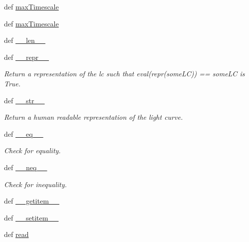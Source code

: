 \begin{DoxyCompactItemize}
def \hyperlink{classpython_1_1libcarma_1_1libcarma_1_1lc_a801161c80acc479a6e76580e34b2e5d1}{max\-Timescale}
\item 
def \hyperlink{classpython_1_1libcarma_1_1libcarma_1_1lc_a801161c80acc479a6e76580e34b2e5d1}{max\-Timescale}
\item 
def \hyperlink{classpython_1_1libcarma_1_1libcarma_1_1lc_ab37669df5bdf0f934f50b13118abc06b}{\-\_\-\-\_\-len\-\_\-\-\_\-}
\item 
def \hyperlink{classpython_1_1libcarma_1_1libcarma_1_1lc_a77ac4622001812f6da9ff42fef654844}{\-\_\-\-\_\-repr\-\_\-\-\_\-}
\begin{DoxyCompactList}\small\item\em Return a representation of the lc such that eval(repr(some\-L\-C)) == some\-L\-C is True. \end{DoxyCompactList}\item 
def \hyperlink{classpython_1_1libcarma_1_1libcarma_1_1lc_abde0414f9b96376bd15efce8d98ffbb4}{\-\_\-\-\_\-str\-\_\-\-\_\-}
\begin{DoxyCompactList}\small\item\em Return a human readable representation of the light curve. \end{DoxyCompactList}\item 
def \hyperlink{classpython_1_1libcarma_1_1libcarma_1_1lc_a0bd6ef26a6db8d90d6feb317f7478b92}{\-\_\-\-\_\-eq\-\_\-\-\_\-}
\begin{DoxyCompactList}\small\item\em Check for equality. \end{DoxyCompactList}\item 
def \hyperlink{classpython_1_1libcarma_1_1libcarma_1_1lc_af328e7a6a692a0eba9c5863f4a74a195}{\-\_\-\-\_\-neq\-\_\-\-\_\-}
\begin{DoxyCompactList}\small\item\em Check for inequality. \end{DoxyCompactList}\item 
def \hyperlink{classpython_1_1libcarma_1_1libcarma_1_1lc_a02254d5c689328df4270e68a16db8d96}{\-\_\-\-\_\-getitem\-\_\-\-\_\-}
\item 
def \hyperlink{classpython_1_1libcarma_1_1libcarma_1_1lc_a211a3ef8d47d716e47338adce5137194}{\-\_\-\-\_\-setitem\-\_\-\-\_\-}
\item 
def \hyperlink{classpython_1_1libcarma_1_1libcarma_1_1lc_a5baab9f679fcde38644c7b2decdabd61}{read}
\end{DoxyCompactItemize}
